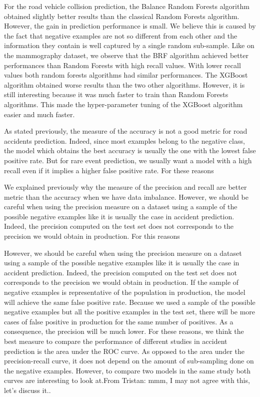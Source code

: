 \documentclass[conference]{IEEEtran}
\newcommand{\TG}[1]{\colorlet{saved}{.}\color{orange}From Tristan: #1\color{saved}}
\begin{document}
For the road vehicle collision prediction, the Balance Random Forests algorithm obtained slightly better results than the classical Random Forests algorithm. However, the gain in prediction performance is small. We believe this is caused by the fact that negative examples are not so different from each other and the information they contain is well captured by a single random sub-sample. Like on the mammography dataset, we observe that the BRF algorithm achieved better performances than Random Forests with high recall values. With lower recall values both random forests algorithms had similar performances. The XGBoost algorithm obtained worse results than the two other algorithms. However, it is still interesting because it was much faster to train than Random Forests algorithms. This made the hyper-parameter tuning of the XGBoost algorithm easier and much faster. 

As stated previously, the measure of the accuracy is not a good metric for road accidents prediction. Indeed, since most examples belong to the negative class, the model which obtains the best accuracy is usually the one with the lowest false positive rate. But for rare event prediction, we usually want a model with a high recall even if it implies a higher false positive rate. For these reasons

We explained previously why the measure of the precision and recall are better metric than the accuracy when we have data imbalance. However, we should be careful when using the precision measure on a dataset using a sample of the possible negative examples like it is usually the case in accident prediction. Indeed, the precision computed on the test set does not corresponds to the precision we would obtain in production.
For this reasons 
  
However, we should be careful when using the precision measure on a dataset using a sample of the possible negative examples like it is usually the case in accident prediction. Indeed, the precision computed on the test set does not corresponds to the precision we would obtain in production.
If the sample of negative examples is representative of the population
in production, the model will achieve the same false positive rate.
Because we used a sample of the possible negative examples but all the 
positive examples in the test set, there will be more cases of false positive in production for the same number of positives. As a consequence, the precision will be much lower.
For these reasons, we think the best measure to compare the performance of
different studies in accident prediction is the area under the ROC curve.
As opposed to the area under the precision-recall curve, it does not depend on the amount of sub-sampling done on the negative examples. However, to compare two models in the same study both curves are interesting to look at.\TG{mmm, I may not agree with this, let's discuss it.}. 
\end{document}
